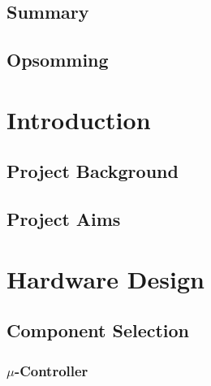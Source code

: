 \documentclass[12pt,a4paper]{report}
\begin{document}
\section*{Summary}
\section*{Opsomming}


\newpage

\tableofcontents
\listoffigures
\listoftables
\printacronyms[include-classes=abbrev,name={List of Abbreviations}]
\newpage

\chapter{Introduction}
\section{Project Background}
\section{Project Aims}

\chapter{Hardware Design}
\section{Component Selection}
\subsection{$\mu$-Controller}
\end{document}
